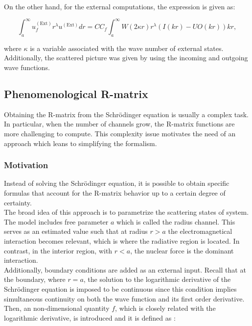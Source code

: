 \documentclass[openany]{book}
\begin{document}
On the other hand, for the external computations, the expression is given as: 


\begin{equation}\label{rmatrix_radiativeCapture_integral_external}
	\int_a^{\infty} u^{(\mathrm{Ext})}_f r^\lambda u^{(\mathrm{Ext})}  dr = C C_f \int_a^{\infty} W (2\kappa r) r^{\lambda} (I(kr) - U O(kr)) kr, 
\end{equation}

where $\kappa$ is a variable associated with the wave number of external states. Additionally, the scattered picture was given by using the incoming and outgoing wave functions. 

\subsection{Phenomenological R-matrix} \label{sub:rmatrix_phenomenological}

Obtaining the R-matrix from the Schrödinger equation is usually a complex task. In particular, when the number of channels grow, the R-matrix functions are more challenging to compute. This complexity issue motivates the need of an approach which leans to simplifying the formalism.  \\

\subsubsection{Motivation} \label{ssub:rmatrix_phenomenological_motivation}


Instead of solving the Schrödinger equation, it is possible to obtain specific formulas that account for the R-matrix  behavior up to a certain degree of certainty.  \\

The broad idea of this approach is to parametrize the scattering states of system.  The model includes free parameter $a$ which is called the radius channel. This serves as an estimated value such that at radius $r > a$ the electromagnetical interaction becomes relevant, which is where the radiative region is located. In contrast, in the interior region, with $r < a$, the nuclear force is the dominant interaction. \\

Additionally, boundary conditions are added as an external input. Recall that at the boundary, where $r = a$, the solution to the logarithmic derivative of the Schrödinger equation is imposed to be continuous since this condition implies simultaneous continuity on both the wave function and its first order derivative. Then, an non-dimensional quantity $f$, which is closely related with the logarithmic derivative, is introduced and it is defined as \cite{iliadis_2015}:
\end{document}
